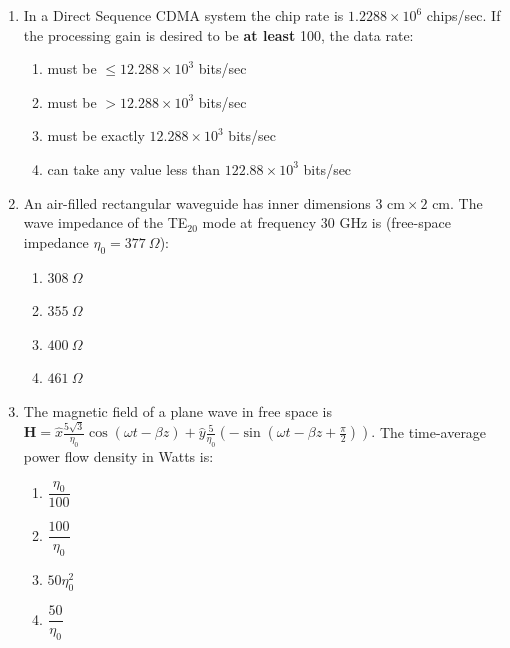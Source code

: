 \documentclass[journal,12pt,onecolumn]{IEEEtran}
\theoremstyle{remark}
\begin{document}
\begin{enumerate}
\item In a Direct Sequence CDMA system the chip rate is $1.2288\times10^6$ chips/sec. If the processing gain is desired to be \textbf{at least} 100, the data rate:
\hfill{}

\begin{enumerate}
  \item must be $\le 12.288\times10^3$ bits/sec
  \item must be $>12.288\times10^3$ bits/sec
  \item must be exactly $12.288\times10^3$ bits/sec
  \item can take any value less than $122.88\times10^3$ bits/sec
\end{enumerate}

\item An air-filled rectangular waveguide has inner dimensions $3\text{ cm}\times2\text{ cm}$. The wave impedance of the TE$_{20}$ mode at frequency 30 GHz is (free-space impedance $\eta_0=377~\Omega$): 
\hfill{}

\begin{multicols}{4}
\begin{enumerate}
  \item $308~\Omega$
  \item $355~\Omega$
  \item $400~\Omega$
  \item $461~\Omega$
\end{enumerate}
\end{multicols}

\item The magnetic field of a plane wave in free space is
$
\mathbf{H} = \hat{x} \frac{5\sqrt{3}}{\eta_0} \cos(\omega t - \beta z)
+ \hat{y} \frac{5}{\eta_0} \left(-\sin(\omega t - \beta z + \frac{\pi}{2})\right).
$
The time-average power flow density in Watts is: 
\hfill{}

\begin{multicols}{4}
\begin{enumerate}
  \item $\dfrac{\eta_0}{100}$
  \item $\dfrac{100}{\eta_0}$
  \item $50\eta_0^2$
  \item $\dfrac{50}{\eta_0}$
\end{enumerate}
\end{multicols}


\end{enumerate}
\end{document}
